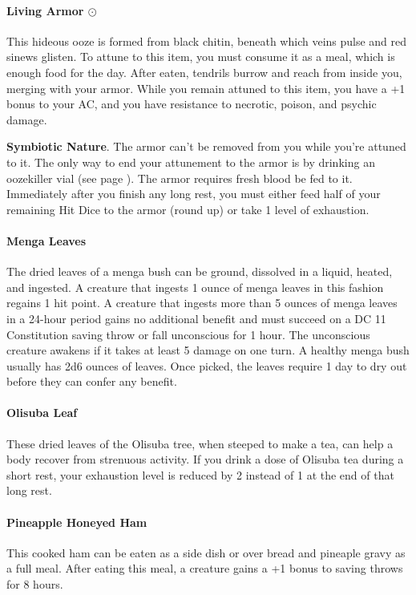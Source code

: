     \paragraph{Living Armor $\odot$} \label{item::livingarmor}
        This hideous ooze is formed from black chitin, beneath which veins pulse and red sinews glisten.
        To attune to this item, you must consume it as a meal, which is enough food for the day.
        After eaten, tendrils burrow and reach from inside you, merging with your armor.
        While you remain attuned to this item, you have a +1 bonus to your AC, and you have resistance to necrotic, poison, and psychic damage.

        \textbf{Symbiotic Nature}.
        The armor can't be removed from you while you're attuned to it.
        The only way to end your attunement to the armor is by drinking an oozekiller vial (see page \pageref{item::oozekiller}).
        The armor requires fresh blood be fed to it.
        Immediately after you finish any long rest, you must either feed half of your remaining Hit Dice to the armor (round up) or take 1 level of exhaustion.
    \paragraph{Menga Leaves}
        The dried leaves of a menga bush can be ground, dissolved in a liquid, heated, and ingested.
        A creature that ingests 1 ounce of menga leaves in this fashion regains 1 hit point.
        A creature that ingests more than 5 ounces of menga leaves in a 24-hour period gains no additional benefit and must succeed on a DC 11 Constitution saving throw or fall unconscious for 1 hour.
        The unconscious creature awakens if it takes at least 5 damage on one turn.
        A healthy menga bush usually has 2d6 ounces of leaves.
        Once picked, the leaves require 1 day to dry out before they can confer any benefit.
    \paragraph{Olisuba Leaf}
        These dried leaves of the Olisuba tree, when steeped to make a tea, can help a body recover from strenuous activity.
        If you drink a dose of Olisuba tea during a short rest, your exhaustion level is reduced by 2 instead of 1 at the end of that long rest.
    \paragraph{Pineapple Honeyed Ham}
        This cooked ham can be eaten as a side dish or over bread and pineaple gravy as a full meal.
        After eating this meal, a creature gains a +1 bonus to saving throws for 8 hours.
